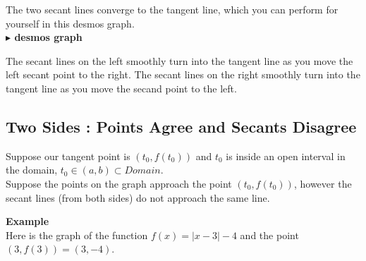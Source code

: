 \documentclass{ximera}
\begin{document}
The two secant lines converge to the tangent line, which you can perform for yourself in this desmos graph. \\





\textbf{\textcolor{blue!55!black}{$\blacktriangleright$ desmos graph}} 
\begin{center}
\end{center}







The secant lines on the left smoothly turn into the tangent line as you move the left secant point to the right. The secant lines on the right smoothly turn into the tangent line as you move the secand point to the left. \\

























\subsection*{Two Sides : Points Agree and Secants Disagree}


Suppose our tangent point is $(t_0 , f(t_0))$ and $t_0$ is inside an open interval in the domain, $t_0 \in (a, b) \subset Domain$. \\


Suppose the points on the graph approach the point $(t_0 , f(t_0))$, however the secant lines (from both sides) do not approach the same line.



\textbf{\textcolor{blue!55!black}{Example}}  \\




Here is the graph of the function $f(x) = | x - 3 | - 4$ and the point $(3, f(3))= (3, -4)$. \\
\end{document}
